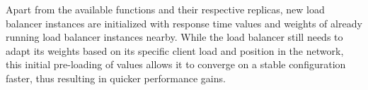 Apart from the available functions and their respective replicas, new load balancer instances are initialized with response time values and weights of already running load balancer instances nearby.
While the load balancer still needs to adapt its weights based on its specific client load and position in the network, this initial pre-loading of values allows it to converge on a stable configuration faster, thus resulting in quicker performance gains.

